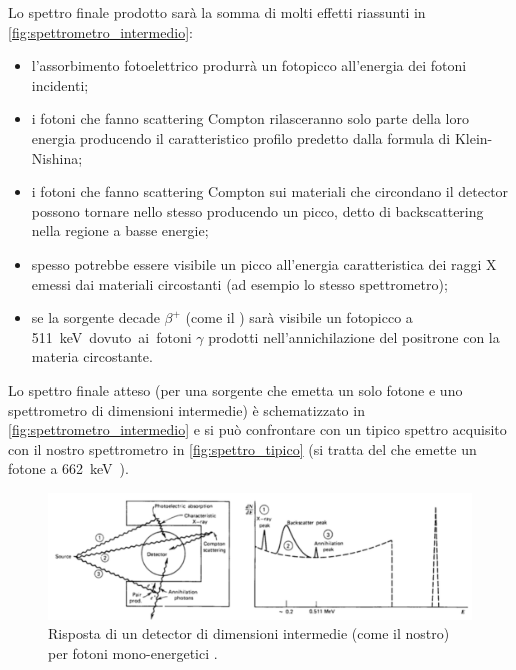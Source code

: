  Lo spettro finale prodotto sarà la somma di molti effetti riassunti in \autoref{fig:spettrometro_intermedio}:
 \begin{itemize}
 	\item l'assorbimento fotoelettrico produrrà un fotopicco all'energia dei fotoni incidenti;
 	\item i fotoni che fanno scattering Compton rilasceranno solo parte della loro energia producendo il caratteristico profilo predetto dalla  formula di Klein-Nishina;
 	\item i fotoni che fanno scattering Compton sui materiali che circondano il detector possono tornare nello stesso producendo un picco, detto di backscattering nella regione a basse energie;
 	\item spesso potrebbe essere visibile un picco all'energia caratteristica dei raggi X emessi dai materiali circostanti (ad esempio lo stesso spettrometro);
 	\item se la sorgente decade $\beta^+$ (come il \na) sarà visibile un fotopicco a \SI{511}keV dovuto ai fotoni $\gamma$ prodotti nell'annichilazione del positrone con la materia circostante.
 \end{itemize}
Lo spettro finale atteso (per una sorgente che emetta un solo fotone e uno spettrometro di dimensioni intermedie) è schematizzato in \autoref{fig:spettrometro_intermedio} e si può confrontare con un tipico spettro acquisito con il nostro spettrometro in \autoref{fig:spettro_tipico} (si tratta del \cs\; che emette un fotone a \SI{662}keV).

 \begin{figure}[h]
	\centering
	\includegraphics[width=\textwidth]{spettrometro_intermedio}
	\caption{\label{fig:spettrometro_intermedio}Risposta di un detector di dimensioni intermedie (come il nostro) per fotoni mono-energetici \cite{6}.}
 \end{figure}

